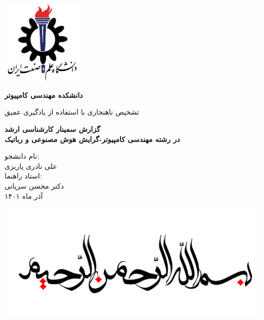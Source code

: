 \documentclass[12pt,a4paper]{report}
\theoremstyle{definition}
\theoremstyle{definition}
\begin{document}
	\thispagestyle{empty}
	\vspace*{25mm}
	\centerline{\includegraphics[height=4cm]{./images/logos/iust.png}}

	\begin{center}
	\textbf{
		دانشکده مهندسی کامپیوتر
	}
	\\[1cm]
	\baselineskip=2cm
	{\titr
	\begin{Huge}
	تشخیص ناهنجاری با استفاده از یادگیری عمیق\\[1cm]
	\end{Huge}}
	{\Large 
		\textbf{
			گزارش سمینار کارشناسی ارشد\\
			در رشته مهندسی کامپیوتر-گرایش هوش مصنوعی و رباتیک
		} \\[1cm]
	}

	{\Large { 
	نام دانشجو:
	}
	\\
	{\Large  علی نادری پاریزی }
	\\[.5cm]
	{\Large  
		استاد راهنما:
	}
	\\
	{\Large دکتر محسن سریانی}
	\\[.6cm]
	}
	آذر ماه ۱۴۰۱
	\end{center}

	\newpage
		\begin{center}
		\includegraphics[width=\linewidth]{./images/logos/in-the-name-of-god.jpg}
		\end{center}
	\newpage
	
	
\end{document}
